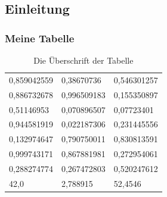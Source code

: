 \documentclass[ngerman]{beamer}
\begin{document}
\subsection{Einleitung}

\begin{frame}
	\frametitle{Meine Tabelle}
	
\begin{table}
	\caption{Die Überschrift der Tabelle}
\begin{tabular}{lll} \toprule[1.5pt]
	0,859042559	&	0,38670736	&	0,546301257	\\
	0,886732678	&	0,996509183	&	0,155350897	\\
	0,51146953	&	0,070896507	&	0,07723401	\\
	0,944581919	&	0,022187306	&	0,231445556	\\
	0,132974647	&	0,790750011	&	0,830813591	\\
	0,999743171	&	0,867881981	&	0,272954061	\\
	0,288274774	&	0,267472803	&	0,520247612	\\
	42,0 & 2,788915 & 52,4546 \\ \bottomrule[1.5pt]
\end{tabular}
\end{table}
	
\end{frame}
\end{document}
